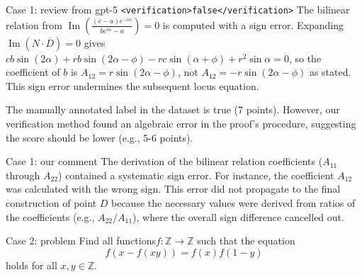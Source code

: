 \documentclass{article} %
\begin{document}
\begin{promptbox}{Case 1: review from gpt-5}
\verb|<verification>false</verification>|
The bilinear relation from $\operatorname{Im}\left(\frac{(c-a)e^{-i\alpha}}{be^{i\alpha}-a}\right)=0$ is computed with a sign error. Expanding $\operatorname{Im}(N\cdot\overline{D})=0$ gives $cb \sin(2\alpha) + r b \sin(2\alpha-\phi) - r c \sin(\alpha+\phi) + r^2 \sin \alpha = 0$, so the coefficient of $b$ is $A_{12} = r \sin(2\alpha-\phi)$, not $A_{12} = -r \sin(2\alpha-\phi)$ as stated. This sign error undermines the subsequent locus equation.
 
\end{promptbox}
The manually annotated label in the dataset is true (7 points). However, our verification method found an algebraic error in the proof's procedure, suggesting the score should be lower (e.g., 5-6 points).

\begin{promptbox}{Case 1: our comment}
   The derivation of the bilinear relation coefficients ($A_{11}$ through $A_{22}$) contained a systematic sign error. For instance, the coefficient $A_{12}$ was calculated with the wrong sign. This error did not propagate to the final construction of point $D$ because the necessary values were derived from ratios of the coefficients (e.g., $A_{22}/A_{11}$), where the overall sign difference cancelled out.
\end{promptbox}

\begin{promptbox}{Case 2: problem}
Find all functions$f:\mathbb{Z}\rightarrow\mathbb{Z}$
 such that the equation
 \[
 f(x-f(xy))=f(x)f(1-y)
 \]
 holds for all $x,y\in\mathbb{Z}$.
\end{promptbox}
\end{document}
